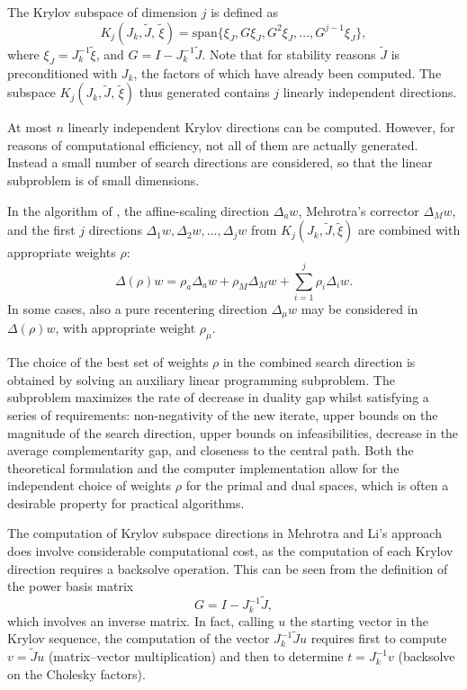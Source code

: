 The Krylov subspace of dimension $j$ is defined as
\[
K_j (J_k, \tilde J, \, \tilde \xi) =
{\mbox{span}} \{ \xi_J, G \xi_J, G^2 \xi_J, \dots,  G^{j-1} \xi_J \}, 
\]
where $\xi_J = J_k^{-1} \tilde \xi$, and $G = I - J_k^{-1} \tilde J$. 
Note that for stability reasons $\tilde J$ is preconditioned with $J_k$, 
the factors of which have already been computed.
The subspace $K_j (J_k, \tilde J, \, \tilde \xi)$
thus generated contains $j$ linearly independent directions. 

At most $n$ linearly independent Krylov directions can be
computed. However, for reasons of computational efficiency, 
not all of them are actually generated. Instead a small number
of search directions are considered, so that the linear subproblem 
is of small dimensions.

In the algorithm of \cite{MehrotraLi}, the affine-scaling
direction $\Delta_a w$, Mehrotra's corrector $\Delta_M w$, and
the first $j$ directions $\Delta_1 w, \Delta_2 w, \dots, \Delta_j w$ 
from $K_j (J_k, \tilde J, \tilde \xi)$ are 
combined with appropriate weights $\rho$:
\[
\Delta(\rho) w = \rho_a\Delta_a w + \rho_M\Delta_M w
               + \sum_{i=1}^j \rho_i \Delta_i w.
\]
In some cases, also a pure recentering direction $\Delta_\mu w$ may
be considered in $\Delta(\rho) w$, with appropriate weight $\rho_\mu$.

The choice of the best set of weights $\rho$ in the combined search 
direction is obtained by solving an auxiliary linear programming 
subproblem. The subproblem maximizes the rate of decrease 
in duality gap whilst satisfying a series of requirements:
non-negativity of the new iterate,
upper bounds on the magnitude of the search direction,
upper bounds on infeasibilities,
decrease in the average complementarity gap,
and closeness to the central path.
Both the theoretical formulation and the computer implementation 
allow for the independent choice of weights $\rho$ for the primal 
and dual spaces, which is often a desirable property for
practical algorithms.

The computation of Krylov subspace directions in Mehrotra and Li's 
approach does involve considerable computational cost, as
the computation of each Krylov direction requires a backsolve operation. 
This can be seen from the definition of the power basis matrix
\[
  G = I - J_k^{-1}\tilde J,
\]
which involves an inverse matrix. In fact, calling $u$ the starting vector 
in the Krylov sequence, the computation of the vector $ J_k^{-1}\tilde Ju$ 
requires first to compute $v = \tilde Ju$ (matrix--vector multiplication) 
and then to determine $t=J_k^{-1}v$ (backsolve on the Cholesky factors).

